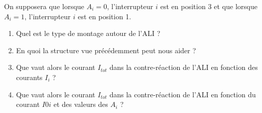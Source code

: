 On supposera que lorsque $A_i = 0$, l'interrupteur $i$ est en position 3 et que lorsque $A_i = 1$, l'interrupteur $i$ est en position 1.

\begin{enumerate}
	\item Quel est le type de montage autour de l'ALI ?
	\item En quoi la structure vue précédemment peut nous aider ?
	\item Que vaut alors le courant $I_{tot}$ dans la contre-réaction de l'ALI en fonction des courants $I_i$ ?	
	\item Que vaut alors le courant $I_{tot}$ dans la contre-réaction de l'ALI en fonction du courant $I0i$ et des valeurs des $A_i$ ?

\end{enumerate}
